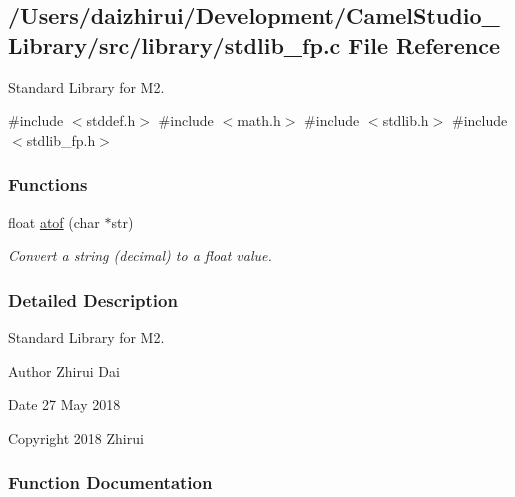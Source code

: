 \hypertarget{a00065}{}\subsection{/\+Users/daizhirui/\+Development/\+Camel\+Studio\+\_\+\+Library/src/library/stdlib\+\_\+fp.c File Reference}
\label{a00065}


Standard Library for M2.  


{\ttfamily \#include $<$stddef.\+h$>$}\newline
{\ttfamily \#include $<$math.\+h$>$}\newline
{\ttfamily \#include $<$stdlib.\+h$>$}\newline
{\ttfamily \#include $<$stdlib\+\_\+fp.\+h$>$}\newline
\subsubsection*{Functions}
\begin{DoxyCompactItemize}
\item 
float \mbox{\hyperlink{a00065_a40bb24dc7d4d98600cd976323cea17e0}{atof}} (char $\ast$str)
\begin{DoxyCompactList}\small\item\em Convert a string (decimal) to a float value. \end{DoxyCompactList}\end{DoxyCompactItemize}


\subsubsection{Detailed Description}
Standard Library for M2. 

\begin{DoxyAuthor}{Author}
Zhirui Dai 
\end{DoxyAuthor}
\begin{DoxyDate}{Date}
27 May 2018 
\end{DoxyDate}
\begin{DoxyCopyright}{Copyright}
2018 Zhirui 
\end{DoxyCopyright}


\subsubsection{Function Documentation}
\mbox{\label{a00065_a40bb24dc7d4d98600cd976323cea17e0}} 
